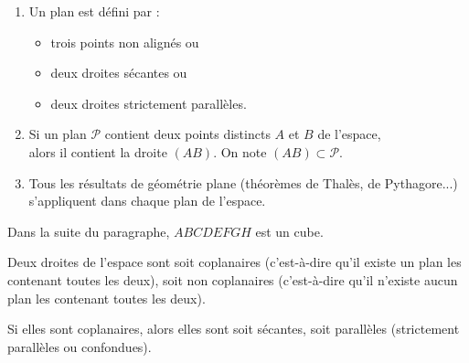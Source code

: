 \documentclass{cornouaille}
\begin{document}
\begin{rappel}
  \begin{enumerate}
  \item Un plan est défini par :
    \begin{itemize}
    \item [\textbullet] trois points non alignés ou
    \item [\textbullet] deux droites sécantes ou
    \item [\textbullet] deux droites strictement parallèles.
    \end{itemize}
  \item Si un plan $\mathcal{P}$ contient deux points distincts $A$ et
    $ B$ de l'espace,\\
    alors il contient la droite $(AB)$. On note
    $(AB)\subset \mathcal{P}$.
  \item Tous les résultats de géométrie plane (théorèmes de Thalès, de
    Pythagore...)\\ s'appliquent dans chaque plan de l'espace.
  \end{enumerate}
\end{rappel}
Dans la suite du paragraphe, $ABCDEFGH$ est un cube.\\

\begin{proprietes}
Deux droites de l'espace sont soit
coplanaires (c'est-à-dire qu'il existe un plan les
contenant toutes les deux), soit non coplanaires (c'est-à-dire qu'il
n'existe aucun plan les contenant toutes les deux).

Si elles sont coplanaires, alors elles sont soit sécantes, soit
parallèles (strictement parallèles ou confondues).
\end{proprietes}
\end{document}
